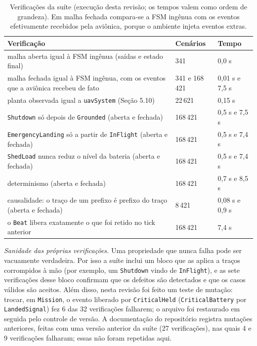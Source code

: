 \documentclass[12pt,a4paper]{article}
\begin{document}
\begin{table}[h]
\centering
\footnotesize
\begin{tabular}{|p{8.3cm}|p{2.6cm}|p{2.2cm}|}
\hline
Verificação & Cenários & Tempo \\
\hline
malha aberta igual à FSM ingênua (saídas e estado final) & 341 & 0,0 s \\
\hline
malha fechada igual à FSM ingênua, com os eventos que a aviônica recebeu de fato & 341 e 168\,421 & 0,01 s e 7,5 s \\
\hline
planta observada igual a \texttt{uavSystem} (Seção 5.10) & 22\,621 & 0,15 s \\
\hline
\texttt{Shutdown} só depois de \texttt{Grounded} (aberta e fechada) & 168\,421 & 0,5 s e 7,5 s \\
\hline
\texttt{EmergencyLanding} só a partir de \texttt{InFlight} (aberta e fechada) & 168\,421 & 0,5 s e 7,4 s \\
\hline
\texttt{ShedLoad} nunca reduz o nível da bateria (aberta e fechada) & 168\,421 & 0,5 s e 7,4 s \\
\hline
determinismo (aberta e fechada) & 168\,421 & 0,7 s e 8,5 s \\
\hline
causalidade: o traço de um prefixo é prefixo do traço (aberta e fechada) & 8\,421 & 0,08 s e 0,9 s \\
\hline
o \texttt{Beat} libera exatamente o que foi retido no tick anterior & 168\,421 & 7,4 s \\
\hline
\end{tabular}
\caption{Verificações da suíte (execução desta revisão; os tempos valem como ordem de grandeza). Em malha fechada compara-se a FSM ingênua com os eventos efetivamente recebidos pela aviônica, porque o ambiente injeta eventos extras.}
\end{table}

\textit{Sanidade das próprias verificações.} Uma propriedade que nunca falha pode ser vacuamente verdadeira. Por isso a suíte inclui um bloco que as aplica a traços corrompidos à mão (por exemplo, um \texttt{Shutdown} vindo de \texttt{InFlight}), e as sete verificações desse bloco confirmam que os defeitos são detectados e que os casos válidos são aceitos. Além disso, nesta revisão foi feito um teste de mutação: trocar, em \texttt{Mission}, o evento liberado por \texttt{CriticalHeld} (\texttt{CriticalBattery} por \texttt{LandedSignal}) fez 6 das 32 verificações falharem; o arquivo foi restaurado em seguida pelo controle de versão. A documentação do repositório registra mutações anteriores, feitas com uma versão anterior da suíte (27 verificações), nas quais 4 e 9 verificações falharam; essas não foram repetidas aqui.
\end{document}
